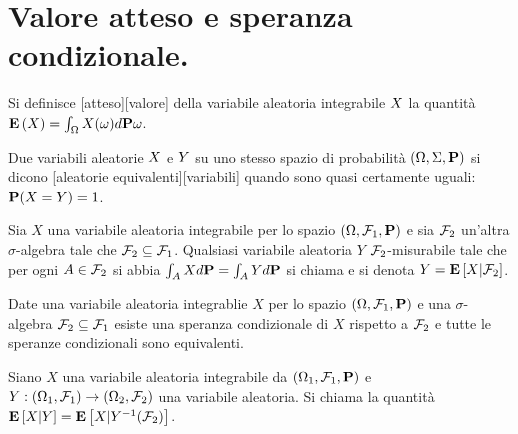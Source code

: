 \section{Valore atteso e speranza condizionale.}\label{ValoreAttesoESperanzaCondizionale}
\begin{Definition}
	Si definisce
  [atteso][valore]
  della variabile aleatoria integrabile $X$ la quantit\`a
  $\ExpectationValue{X} = \int_\SamplesSpace X(\omega) d\Probability{\omega}$.
\end{Definition}
\begin{Definition}
	Due variabili aleatorie $X$ e $Y$ su uno stesso
  spazio di probabilit\`a $(\ProbabilitySpace,\Events,\Probability)$ si dicono
  [aleatorie equivalenti][variabili]
  quando sono quasi certamente uguali:
  $\Probability(X = Y) = 1$.
\end{Definition}
\begin{Definition}
	Sia $X$ una variabile aleatoria integrabile per lo spazio $(\SamplesSpace,\SigmaAlgebra_1,\Probability)$ e sia $\mathcal{F}_2$ un'altra $\sigma$-algebra tale che $\mathcal{F}_2 \subseteq \mathcal{F}_1$. Qualsiasi variabile aleatoria $Y$ $\mathcal{F}_2$-misurabile tale che per ogni $A \in \mathcal{F}_2$ si abbia $\int_A Xd\Probability = \int_A Yd\Probability$ si chiama  e si denota $Y = \mathbf{E} \left [X|\mathcal{F}_2 \right ]$.
\end{Definition}
\begin{Theorem}
	Date una variabile aleatoria integrablie $X$ per lo spazio $(\SamplesSpace,\SigmaAlgebra_1,\Probability)$ e una $\sigma$-algebra $\mathcal{F}_2 \subseteq \mathcal{F}_1$ esiste una speranza condizionale di $X$ rispetto a $\mathcal{F}_2$ e tutte le speranze condizionali sono equivalenti.
\end{Theorem}
\begin{Definition}
	Siano $X$ una variabile aleatoria integrabile da $(\SamplesSpace_1,\SigmaAlgebra_1,\Probability)$ e $Y: (\Omega_1,\mathcal{F}_1) \rightarrow (\Omega_2,\mathcal{F}_2)$ una variabile aleatoria. Si chiama  la quantit\`a $\mathbf{E} \left [X|Y \right ] = \mathbf{E} \left [X|Y^{-1}(\mathcal{F}_2) \right ]$.
\end{Definition}

